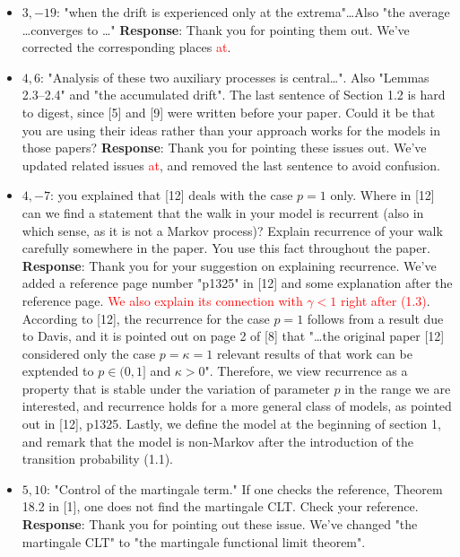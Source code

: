\documentclass[11pt,a4paper]{article}
\numberwithin{equation}{section}
\def\TBF#1{\textcolor{red}{#1}} %
\def\TBC#1{\textcolor{red}{#1}} %
\begin{document}
\begin{itemize}
		\item 
		$3,-19$: "when the drift is experienced only at the extrema"\dots Also "the average \dots converges to \dots"
		\subitem \textbf{Response}: Thank you for pointing them out. We've corrected the  corresponding places \TBF{at}.
		
		\item 
		$4,6$: "Analysis of these two auxiliary processes is central\dots". Also "Lemmas 2.3--2.4" and "the accumulated drift". The last sentence of Section 1.2 is hard to digest, since [5] and [9] were written before your paper. Could it be that you are using their ideas rather than your approach works for the models in those papers?
		\subitem \textbf{Response}: Thank you for pointing these issues out. We've updated related issues \TBF{at}, and removed the last sentence to avoid confusion.
		
		
		\item 
		$4,-7$: you explained that [12] deals with the case $p = 1$ only. Where in [12] can we find a statement	that the walk in your model is recurrent (also in which sense, as it is not a Markov process)? Explain recurrence of your walk carefully somewhere in the paper. You use this fact throughout the paper.
		\subitem \textbf{Response}:
		Thank you for your suggestion on explaining recurrence. We've added a reference page number "p1325" in [12] and some explanation after the reference page. \TBC{We also explain its connection with $\gamma<1$ right after (1.3)}. According to [12], the recurrence for the case $p=1$ follows from a result due to Davis, and it is pointed out on page 2 of [8] that "\dots the original paper [12] considered only the case $p=\kappa= 1$ relevant results of that work can be exptended to $p\in (0,1]$ and $\kappa>0$". Therefore, we view recurrence as a property that is stable under the variation of parameter $p$ in the range we are interested, and recurrence holds for a more general class of models, as pointed out in [12], p1325.
		Lastly, we define the model at the beginning of section 1, and remark that the model is non-Markov after the introduction of the transition probability (1.1). 
		
		
		\item 
		$5,10$: "Control of the martingale term." If one checks the reference, Theorem 18.2 in [1], one does not find the martingale CLT. Check your reference.
		\subitem \textbf{Response}:
		Thank you for pointing out these issue. We've changed "the martingale CLT" to "the martingale functional limit theorem".
		

\end{itemize}
\end{document}
